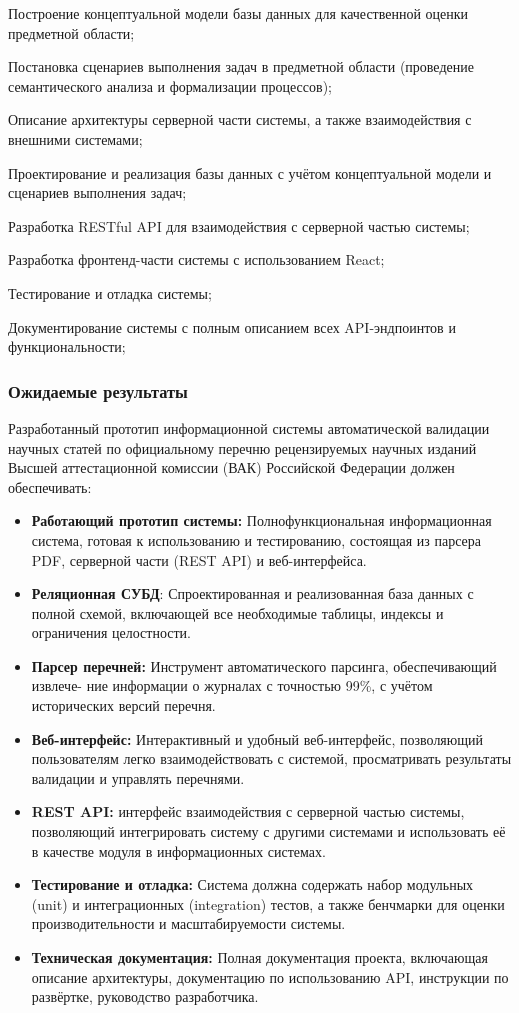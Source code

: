 \begin{compactenum}
	\item Построение концептуальной модели базы данных для качественной оценки предметной области;
	\item Постановка сценариев выполнения задач в предметной области (проведение семантического анализа и формализации процессов);
	\item Описание архитектуры серверной части системы, а также взаимодействия с внешними системами;
	\item Проектирование и реализация базы данных с учётом концептуальной модели и сценариев выполнения задач;
	\item Разработка RESTful API для взаимодействия с серверной частью системы;
	\item Разработка фронтенд-части системы с использованием React;
	\item Тестирование и отладка системы;
	\item Документирование системы с полным описанием всех API-эндпоинтов и функциональности;
\end{compactenum}

\subsubsection{Ожидаемые результаты}
Разработанный прототип информационной системы автоматической валидации научных статей по
официальному перечню рецензируемых научных изданий Высшей аттестационной комиссии (ВАК)
Российской Федерации должен обеспечивать:

\begin{itemize}
	\item \textbf{Работающий прототип системы:} Полнофункциональная информационная система,
	готовая к использованию и тестированию, состоящая из парсера PDF, серверной части (REST API) и веб-интерфейса.
	\item \textbf{Реляционная СУБД}: Спроектированная и реализованная база данных с полной схемой,
	включающей все необходимые таблицы, индексы и ограничения целостности.
	\item \textbf{Парсер перечней:} Инструмент автоматического парсинга, обеспечивающий извлече-
	ние информации о журналах с точностью 99\%, с учётом исторических версий перечня.
	\item \textbf{Веб-интерфейс:} Интерактивный и удобный веб-интерфейс, позволяющий пользователям
	легко взаимодействовать с системой, просматривать результаты валидации и управлять перечнями.
	\item \textbf{REST API:} интерфейс взаимодействия с серверной частью системы, позволяющий интегрировать систему с другими системами и
	использовать её в качестве модуля в информационных системах. 
	\item \textbf{Тестирование и отладка:} Система должна содержать набор модульных (unit) и интеграционных (integration) тестов,
	а также бенчмарки для оценки производительности и масштабируемости системы.
	\item \textbf{Техническая документация:} Полная документация проекта, включающая описание
	архитектуры, документацию по использованию API, инструкции по развёртке, руководство разработчика.
\end{itemize}

